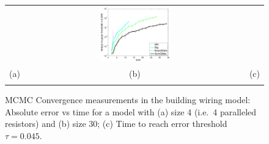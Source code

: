 \documentclass[]{article}
\newcommand{\nnn}{0.33}
\newcommand{\nnh}{0.23}
\begin{document}
\begin{figure}[t!]
\begin{center}
\begin{tabular}{ccc}
& \hspace{-3mm} \includegraphics[width=\nnn\textwidth, height=\nnh\textwidth]{plotsx/conductancex/time_vs_param-errorbar.pdf}
\vspace{-1.5mm}
\\
\hspace{-5mm} \footnotesize(a) 
& \hspace{-4mm} \footnotesize(b) 
& \hspace{-3mm} \footnotesize(c) \\
\multicolumn{3}{c}{}
\end{tabular}
\end{center}
\vspace{-6mm}
\caption{\footnotesize 
MCMC Convergence measurements in the building wiring model: 
Absolute error vs time for a model with (a) size 4 (i.e.\ 4 paralleled resistors) and (b) size 30; (c) Time to reach error threshold $\tau=0.045$.}
\label{fig:resistor}
\vspace{-2mm}
\end{figure}
\end{document}
